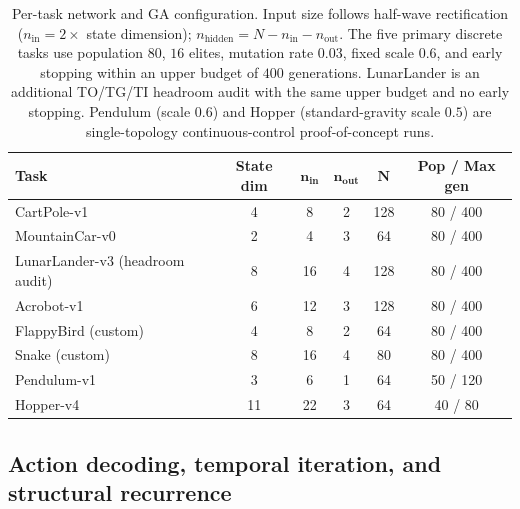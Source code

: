 \documentclass[10pt]{article}
\begin{document}
\begin{table}[H]
\centering
\small
\caption{Per-task network and GA configuration. Input size follows half-wave
rectification ($n_\text{in}=2\times$ state dimension);
$n_\text{hidden}=N-n_\text{in}-n_\text{out}$. The five primary discrete tasks use
population $80$, $16$ elites, mutation rate $0.03$, fixed scale $0.6$, and early
stopping within an upper budget of $400$ generations. LunarLander is an
additional TO/TG/TI headroom audit with the same upper budget and no early
stopping. Pendulum (scale $0.6$) and Hopper (standard-gravity scale $0.5$) are
single-topology continuous-control proof-of-concept runs.}
\label{tab:evo-config}
\begin{tabular}{@{}lccccc@{}}
\toprule
\textbf{Task} & \textbf{State dim} & $\mathbf{n_\text{in}}$ & $\mathbf{n_\text{out}}$ & $\mathbf{N}$ & \textbf{Pop / Max gen} \\
\midrule
CartPole-v1        & 4  & 8  & 2 & 128 & 80 / 400 \\
MountainCar-v0     & 2  & 4  & 3 & 64  & 80 / 400 \\
LunarLander-v3 (headroom audit) & 8 & 16 & 4 & 128 & 80 / 400 \\
Acrobot-v1         & 6  & 12 & 3 & 128 & 80 / 400 \\
FlappyBird (custom)& 4  & 8  & 2 & 64  & 80 / 400 \\
Snake (custom)     & 8  & 16 & 4 & 80  & 80 / 400 \\
Pendulum-v1        & 3  & 6  & 1 & 64  & 50 / 120 \\
Hopper-v4          & 11 & 22 & 3 & 64  & 40 / 80 \\
\bottomrule
\end{tabular}
\end{table}

\subsection{Action decoding, temporal iteration, and structural recurrence}
\label{sec:decoding}
\end{document}
